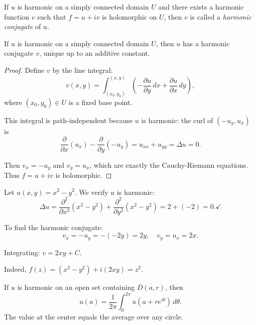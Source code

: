 \begin{definition}
  If $u$ is harmonic on a simply connected domain $U$ and there exists a harmonic function $v$ such that $f = u + iv$ is holomorphic on $U$, then $v$ is called a \emph{harmonic conjugate} of $u$.
\end{definition}

\begin{theorem}
  If $u$ is harmonic on a simply connected domain $U$, then $u$ has a harmonic conjugate $v$, unique up to an additive constant.
\end{theorem}

\begin{proof}
  Define $v$ by the line integral:
  \[
    v(x,y) = \int_{(x_0,y_0)}^{(x,y)} \left( -\frac{\partial u}{\partial y} \, dx + \frac{\partial u}{\partial x} \, dy \right),
  \]
  where $(x_0, y_0) \in U$ is a fixed base point.

  This integral is path-independent because $u$ is harmonic: the curl of $(-u_y, u_x)$ is
  \[
    \frac{\partial}{\partial x}(u_x) - \frac{\partial}{\partial y}(-u_y) = u_{xx} + u_{yy} = \Delta u = 0.
  \]

  Then $v_x = -u_y$ and $v_y = u_x$, which are exactly the Cauchy-Riemann equations. Thus $f = u + iv$ is holomorphic.
\end{proof}

\begin{example}
  Let $u(x,y) = x^2 - y^2$. We verify $u$ is harmonic:
  \[
    \Delta u = \frac{\partial^2}{\partial x^2}(x^2 - y^2) + \frac{\partial^2}{\partial y^2}(x^2 - y^2) = 2 + (-2) = 0. \checkmark
  \]

  To find the harmonic conjugate:
  \[
    v_x = -u_y = -(-2y) = 2y, \quad v_y = u_x = 2x.
  \]

  Integrating: $v = 2xy + C$.

  Indeed, $f(z) = (x^2 - y^2) + i(2xy) = z^2$.
\end{example}

\begin{theorem}
  If $u$ is harmonic on an open set containing $\overline{D(a,r)}$, then
  \[
    u(a) = \frac{1}{2\pi} \int_0^{2\pi} u(a + re^{i\theta}) \, d\theta.
  \]
  The value at the center equals the average over any circle.
\end{theorem}

